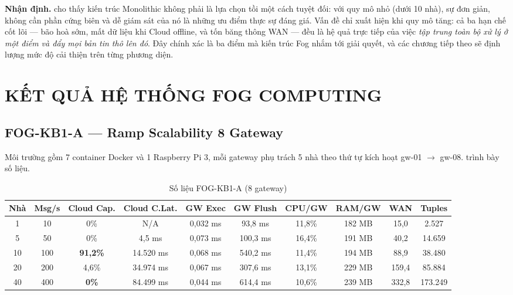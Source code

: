 \documentclass[13pt,a4paper]{report}
\begin{document}
\textbf{Nhận định.}  cho thấy kiến trúc Monolithic không phải
là lựa chọn tồi một cách tuyệt đối: với quy mô nhỏ (dưới 10 nhà), sự đơn giản,
không cần phần cứng biên và dễ giám sát của nó là những ưu điểm thực sự đáng giá.
Vấn đề chỉ xuất hiện khi quy mô tăng: cả ba hạn chế cốt lõi --- bão hoà sớm, mất
dữ liệu khi Cloud offline, và tốn băng thông WAN --- đều là hệ quả trực tiếp của
việc \textit{tập trung toàn bộ xử lý ở một điểm và đẩy mọi bản tin thô lên đó}.
Đây chính xác là ba điểm mà kiến trúc Fog nhắm tới giải quyết, và các chương tiếp
theo sẽ định lượng mức độ cải thiện trên từng phương diện.

\chapter{KẾT QUẢ HỆ THỐNG FOG COMPUTING}
\label{ch:ketqua-fog}

\section{FOG-KB1-A --- Ramp Scalability 8 Gateway}

Môi trường gồm 7 container Docker và 1 Raspberry Pi 3, mỗi gateway phụ trách 5 nhà
theo thứ tự kích hoạt gw-01 $\to$ gw-08.  trình bày số liệu.

\begin{table}[H]
\centering
\caption{Số liệu FOG-KB1-A (8 gateway)}
\label{tab:fog-kb1a}
\scriptsize
\setlength{\tabcolsep}{4pt}
\begin{tabular}{c c c c c c c c c c}
\toprule
\textbf{Nhà} & \textbf{Msg/s} & \textbf{Cloud Cap.} & \textbf{Cloud C.Lat.} & \textbf{GW Exec} & \textbf{GW Flush} & \textbf{CPU/GW} & \textbf{RAM/GW} & \textbf{WAN} & \textbf{Tuples} \\
\midrule
1  & 10  & 0\%            & N/A       & 0,032 ms & 93,8 ms  & 11,8\% & 182 MB & 15,0  & 2.527 \\
5  & 50  & 0\%            & 4,5 ms    & 0,073 ms & 100,3 ms & 16,4\% & 191 MB & 40,2  & 14.659 \\
10 & 100 & \textbf{91,2\%}& 14.520 ms & 0,068 ms & 540,2 ms & 11,4\% & 194 MB & 88,9  & 38.480 \\
20 & 200 & 4,6\%          & 34.974 ms & 0,067 ms & 307,6 ms & 13,1\% & 229 MB & 159,4 & 85.884 \\
40 & 400 & \textbf{0\%}   & 84.499 ms & 0,044 ms & 614,4 ms & 10,6\% & 239 MB & 332,8 & 173.249 \\
\bottomrule
\end{tabular}
\end{table}
\end{document}

